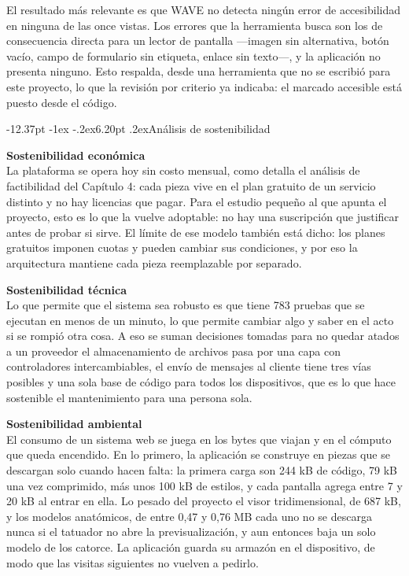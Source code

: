 \documentclass[12pt,letterpaper,oneside]{report}
\makeatletter
\renewcommand\section{\@startsection{section}{1}{\z@}%
  {-12.37pt \@plus -1ex \@minus -.2ex}{6.20pt \@plus.2ex}{\normalfont\large\bfseries}}
\newcommand{\tituloparpegado}[1]{\par\textbf{#1}\\\indent\ignorespaces}
\makeatother
\begin{document}
El resultado más relevante es que WAVE no detecta ningún error de accesibilidad en ninguna de las once vistas. Los errores que la herramienta busca son los de consecuencia directa para un lector de pantalla —imagen sin alternativa, botón vacío, campo de formulario sin etiqueta, enlace sin texto—, y la aplicación no presenta ninguno. Esto respalda, desde una herramienta que no se escribió para este proyecto, lo que la revisión por criterio ya indicaba: el marcado accesible está puesto desde el código.



\section{Análisis de sostenibilidad}

\tituloparpegado{Sostenibilidad económica}
La plataforma se opera hoy sin costo mensual, como detalla el análisis de factibilidad del Capítulo 4: cada pieza vive en el plan gratuito de un servicio distinto y no hay licencias que pagar. Para el estudio pequeño al que apunta el proyecto, esto es lo que la vuelve adoptable: no hay una suscripción que justificar antes de probar si sirve. El límite de ese modelo también está dicho: los planes gratuitos imponen cuotas y pueden cambiar sus condiciones, y por eso la arquitectura mantiene cada pieza reemplazable por separado.

\vspace{\parskip}
\tituloparpegado{Sostenibilidad técnica}
Lo que permite que el sistema sea robusto es que tiene 783 pruebas que se ejecutan en menos de un minuto, lo que permite cambiar algo y saber en el acto si se rompió otra cosa. A eso se suman decisiones tomadas para no quedar atados a un proveedor el almacenamiento de archivos pasa por una capa con controladores intercambiables, el envío de mensajes al cliente tiene tres vías posibles y una sola base de código para todos los dispositivos, que es lo que hace sostenible el mantenimiento para una persona sola.

\vspace{\parskip}
\tituloparpegado{Sostenibilidad ambiental}
El consumo de un sistema web se juega en los bytes que viajan y en el cómputo que queda encendido. En lo primero, la aplicación se construye en piezas que se descargan solo cuando hacen falta: la primera carga son 244 kB de código, 79 kB una vez comprimido, más unos 100 kB de estilos, y cada pantalla agrega entre 7 y 20 kB al entrar en ella. Lo pesado del proyecto el visor tridimensional, de 687 kB, y los modelos anatómicos, de entre 0,47 y 0,76 MB cada uno no se descarga nunca si el tatuador no abre la previsualización, y aun entonces baja un solo modelo de los catorce. La aplicación guarda su armazón en el dispositivo, de modo que las visitas siguientes no vuelven a pedirlo.
\end{document}
